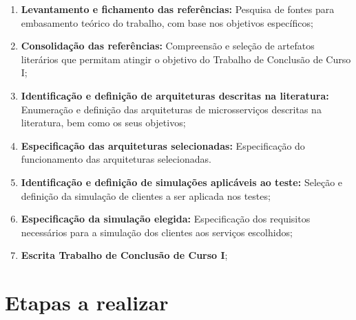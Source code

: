 \begin{enumerate}
  \item \textbf{Levantamento e fichamento das referências:} Pesquisa de fontes para embasamento teórico do trabalho, com base nos objetivos específicos;

  \item \textbf{Consolidação das referências:} Compreensão e seleção de artefatos literários que permitam atingir o objetivo do Trabalho de Conclusão de Curso I;

  \item \textbf{Identificação e definição de arquiteturas descritas na literatura:} Enumeração e definição das arquiteturas de microsserviços descritas na literatura, bem como os seus objetivos;

  \item \textbf{Especificação das arquiteturas selecionadas:} Especificação do funcionamento das arquiteturas selecionadas.

  \item \textbf{Identificação e definição de simulações aplicáveis ao teste:} Seleção e definição da simulação de clientes a ser aplicada nos testes;

  \item \textbf{Especificação da simulação elegida:} Especificação dos requisitos necessários para a simulação dos clientes aos serviços escolhidos;

  \item \textbf{Escrita Trabalho de Conclusão de Curso I};
\end{enumerate}



\section{Etapas a realizar}



